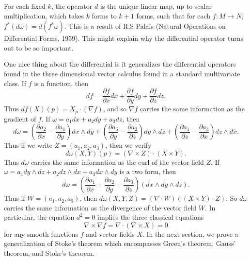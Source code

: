 For each fixed $k$, the operator $d$ is the unique linear map, up to scalar multiplication, which takes $k$ forms to $k+1$ forms, such that for each $f: M \to N$, $f^*(d\omega) = d(f^* \omega)$. This is a result of R.S Palais (Natural Operations on Differential Forms, 1959). This might explain why the differential operator turns out to be so important.

\begin{example}
    One nice thing about the differential is it generalizes the differential operators found in the three dimensional vector calculus found in a standard multivariate class. If $f$ is a function, then
    \[ df = \frac{\partial f}{\partial x} dx + \frac{\partial f}{\partial y} dy + \frac{\partial f}{\partial z} dz. \]
    Thus $df(X)(p) = X_p \cdot (\nabla f)$, and so $\nabla f$ carries the same information as the gradient of $f$. If $\omega = a_1 dx + a_2 dy + a_3 dz$, then
    \[ d\omega = \left( \frac{\partial a_2}{\partial x} - \frac{\partial a_1}{\partial y} \right) dx \wedge dy + \left( \frac{\partial a_3}{\partial y} - \frac{\partial a_2}{\partial z} \right) dy \wedge dz + \left( \frac{\partial a_1}{\partial z} - \frac{\partial a_3}{\partial x} \right) dz \wedge dx. \]
    Thus if we write $Z = (a_1, a_2, a_3)$, then we verify
    \[ d\omega(X,Y)(p) = (\nabla \times Z) \cdot (X \times Y). \]
    Thus $d\omega$ carries the same information as the curl of the vector field $Z$. If $\omega = a_1 dy \wedge dz + a_2 dz \wedge dx + a_3 dx \wedge dy$ is a two form, then
    \[ d\omega = \left(\frac{\partial a_1}{\partial x} + \frac{\partial a_2}{\partial y} + \frac{\partial a_3}{\partial z} \right) (dx \wedge dy \wedge dz). \]
    Thus if $W = (a_1, a_2, a_3)$, then $d\omega(X,Y,Z) = (\nabla \cdot W) ((X \times Y) \cdot Z)$. So $d\omega$ carries the same information as the divergence of the vector field $W$. In particular, the equation $d^2 = 0$ implies the three classical equations
    \[ \nabla \times \nabla f = \nabla \cdot (\nabla \times X) = 0 \]
    for any smooth functions $f$ and vector fields $X$. In the next section, we prove a generalization of Stoke's theorem which encompasses Green's theorem, Gauss' theorem, and Stoke's theorem.
\end{example}


